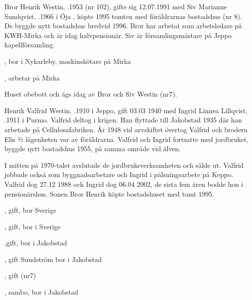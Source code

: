 



Bror Henrik Westin, .1953 (nr 102), gifte sig 12.07.1991 med Siv Marianne Sundqvist, .1966  i Öja , köpte 1995 tomten med föräldrarnas bostadshus (nr 8). De byggde nytt bostadshus bredvid 1996. Bror har arbetat som arbetsledare på KWH-Mirka och är idag halvpensionär. Siv är församlingsmästare på Jeppo kapellförsamling.

\begin{jhchildren}
  \item {}, bor i Nykarleby, maskinskötare på Mirka
  \item {}, arbetar på Mirka
\end{jhchildren}




Huset obebott och ägs idag av Bror och Siv Westin (nr7).

Henrik Valfrid Westin, .1910 i Jeppo, gift 03.03 1940 med Ingrid Linnea Lillqvist, .1911 i Purmo. Valfrid deltog i krigen. Han flyttade till Jakobstad 1935 där han arbetade på Cellulosafabriken.  År 1948 vid arvskiftet övertog Valfrid och brodern Elis ½ lägenheten var av föräldrarna. Valfrid och Ingrid fortsatte med jordbruket, byggde nytt bostadshus 1955, på samma område vid älven.

I mitten på 1970-talet avslutade de jordbruksverksamheten och sålde ut. Valfrid jobbade också som byggnadsarbetare och Ingrid i pälsningsarbete på Keppo. Valfrid dog 27.12 1988 och Ingrid dog 06.04 2002, de sista fem åren bodde hon i  pensionärshus. Sonen Bror Henrik köpte bostadshuset med tomt 1995.
\begin{jhchildren}
  \item {}, gift, bor Sverige
  \item {}, gift, bor i Sverige
  \item {},gift, bor i Jakobstad
  \item {}, gift Sundström bor i Jakobstad
  \item {}, gift (nr7)
  \item {}, sambo, bor i Jakobstad
\end{jhchildren}




